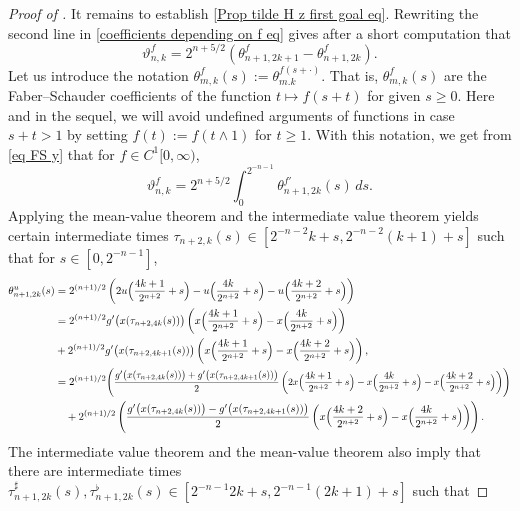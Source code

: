 \documentclass[12pt,reqno]{article}
\newcommand\scalemath[2]{\scalebox{#1}{\mbox{\ensuremath{\displaystyle #2}}}}
\numberwithin{equation}{section}
\theoremstyle{definition}
\begin{document}
\begin{proof}[Proof of ]
	It remains to establish \eqref{Prop tilde H z first goal eq}. 
	Rewriting the second line in \eqref{coefficients depending on f eq}
	gives after a short computation that 
	\begin{equation}\label{eq FS y}
		\vartheta^f_{n,k} =   2^{n+5/2}\left(\theta^f_{n+1,2k+1}-\theta^f_{n+1,2k}\right).	\end{equation}
	Let us  introduce the notation $\theta_{m,k}^f(s):=\theta_{m.k}^{f(s+\cdot)}$. That is, $\theta_{m,k}^f(s)$ are the Faber--Schauder coefficients of the function $t\mapsto f(s+t)$ for given $s\ge0$. Here and in the sequel, we will avoid undefined arguments of functions in case $s+t>1$ by setting $f(t):= f(t \wedge 1)$ for $t \ge 1$. With this notation, 
	we get from \eqref{eq FS y} that for $f\in C^1[0,\infty)$,		\begin{equation}\label{eq zeta v}
		\vartheta^f_{n,k} = 2^{n+5/2}\int_{0}^{2^{-n-1}}\theta^{f'}_{n+1,2k}(s)\,ds .
	\end{equation}
	Applying the mean-value theorem and the intermediate value theorem yields certain intermediate times $\tau_{n+2,k}(s) \in [2^{-n-2}k+s, 2^{-n-2}(k+1)+s]$ such  that for $s \in [0,2^{-n-1}]$, 
	\begin{equation*}
		\begin{split}
			\theta^{u}_{n+1,2k}(s) &= 2^{(n+1)/2}\left(2u\Big(\frac{4k+1}{2^{n+2}}+s\Big)-u\Big(\frac{4k}{2^{n+2}}+s\Big)-u\Big(\frac{4k+2}{2^{n+2}}+s\Big)\right)\\&= 2^{(n+1)/2} g'\big(x(\tau_{n+2,4k}(s))\big)\left(x\Big(\frac{4k+1}{2^{n+2}}+s\Big)-x\Big(\frac{4k}{2^{n+2}}+s\Big)\right) \\
			&+2^{(n+1)/2} g'\big(x(\tau_{n+2,4k+1}(s))\big)\left(x\Big(\frac{4k+1}{2^{n+2}}+s\Big)-x\Big(\frac{4k+2}{2^{n+2}}+s\Big)\right),\\
			&=2^{(n+1)/2}\scalemath{0.9}{\left(\frac{g'\big(x(\tau_{n+2,4k}(s))\big)+g'\big(x(\tau_{n+2,4k+1}(s))\big)}{2}\left(2x\Big(\frac{4k+1}{2^{n+2}}+s\Big)-x\Big(\frac{4k}{2^{n+2}}+s\Big)-x\Big(\frac{4k+2}{2^{n+2}}+s\Big)\right)\right)}\\&\quad+ 2^{(n+1)/2}\left(\frac{g'\big(x(\tau_{n+2,4k}(s))\big)-g'\big(x(\tau_{n+2,4k+1}(s))\big)}{2}\left(x\Big(\frac{4k+2}{2^{n+2}}+s\Big)-x\Big(\frac{4k}{2^{n+2}}+s\Big)\right)\right).
		\end{split}
	\end{equation*}
	The intermediate value theorem  and the mean-value theorem  also imply that there are intermediate times $\tau^\sharp_{n+1,2k}(s),\tau^\flat_{n+1,2k}(s) \in [2^{-n-1}2k+s,2^{-n-1}(2k+1)+s]$ such that 

\end{proof}
\end{document}
